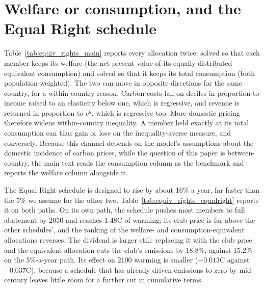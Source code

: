 \documentclass[12pt,english]{article}
\theoremstyle{remark}
\begin{document}



\section{Welfare or consumption, and the Equal Right schedule}
\label{app:ede}

Table~\ref{tab:equiv_rights_main} reports every allocation twice: solved so that each member keeps its welfare (the net present value of its equally-distributed-equivalent consumption) and solved so that it keeps its total consumption (both population-weighted). The two can move in opposite directions for the same country, for a within-country reason. Carbon costs fall on deciles in proportion to income raised to an elasticity below one, which is regressive, and revenue is returned in proportion to $c^{\eta}$, which is regressive too. More domestic pricing therefore widens within-country inequality. A member held exactly at its total consumption can thus gain or lose on the inequality-averse measure, and conversely. Because this channel depends on the model's assumptions about the domestic incidence of carbon prices, while the question of this paper is between-country, the main text reads the consumption column as the benchmark and reports the welfare column alongside it.

The Equal Right schedule is designed to rise by about 16\% a year, far faster than the 5\% we assume for the other two. Table~\ref{tab:equiv_rights_equalright} reports it on both paths. On its own path, the schedule pushes most members to full abatement by 2050 and reaches 1.48\textdegree C of warming; its club price is far above the other schedules', and the ranking of the welfare- and consumption-equivalent allocations reverses. The dividend is larger still: replacing it with the club price and the equivalent allocation cuts the club's emissions by 18.8\%, against 15.2\% on the 5\%-a-year path. Its effect on 2100 warming is smaller ($-0.013$\textdegree C against $-0.037$\textdegree C), because a schedule that has already driven emissions to zero by mid-century leaves little room for a further cut in cumulative terms.
\end{document}
